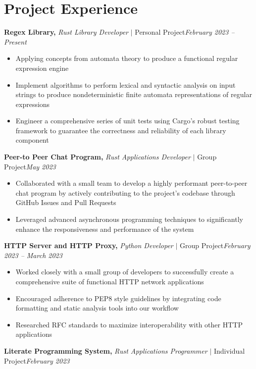 \documentclass[8pt]{extarticle}
\newcommand{\jobentry}[4]{\textbf{#1,} \textit{#2} \(|\) #3\hfill \textit{#4}}
\begin{document}
\section{Project Experience}

\jobentry{Regex Library}{Rust Library Developer}{Personal Project}{February 2023 -- Present}

\begin{itemize}
  \item{Applying concepts from automata theory to produce a functional regular expression engine}
  \item{Implement algorithms to perform lexical and syntactic analysis on input strings to produce nondeterministic finite automata representations of regular expressions}
  \item{Engineer a comprehensive series of unit tests using Cargo’s robust testing framework to guarantee the correctness and reliability of each library component}
\end{itemize}

\jobentry{Peer-to Peer Chat Program}{Rust Applications Developer}{Group Project}{May 2023}

\begin{itemize}
\item{Collaborated with a small team to develop a highly performant peer-to-peer chat program by actively contributing to the project's codebase through GitHub Issues and Pull Requests}
\item{Leveraged advanced asynchronous programming techniques to significantly enhance the responsiveness and performance of the system}
\end{itemize}

\jobentry{HTTP Server and HTTP Proxy}{Python Developer}{Group Project}{February 2023 -- March 2023}

\begin{itemize}
  \item{Worked closely with a small group of developers to successfully create a comprehensive suite of functional HTTP network applications}
  \item{Encouraged adherence to PEP8 style guidelines by integrating code formatting and static analysis tools into our workflow}
  \item{Researched RFC standards to maximize interoperability with other HTTP applications}
\end{itemize}

\jobentry{Literate Programming System}{Rust Applications Programmer}{Individual Project}{February 2023}
\end{document}
